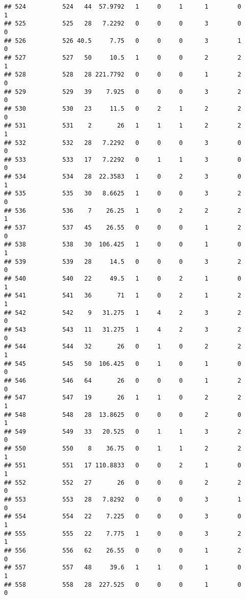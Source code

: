 \documentclass[
]{article}
\begin{document}
\begin{verbatim}
## 524          524   44  57.9792   1     0     1      1        0         1
## 525          525   28   7.2292   0     0     0      3        0         0
## 526          526 40.5     7.75   0     0     0      3        1         0
## 527          527   50     10.5   1     0     0      2        2         1
## 528          528   28 221.7792   0     0     0      1        2         0
## 529          529   39    7.925   0     0     0      3        2         0
## 530          530   23     11.5   0     2     1      2        2         0
## 531          531    2       26   1     1     1      2        2         1
## 532          532   28   7.2292   0     0     0      3        0         0
## 533          533   17   7.2292   0     1     1      3        0         0
## 534          534   28  22.3583   1     0     2      3        0         1
## 535          535   30   8.6625   1     0     0      3        2         0
## 536          536    7    26.25   1     0     2      2        2         1
## 537          537   45    26.55   0     0     0      1        2         0
## 538          538   30  106.425   1     0     0      1        0         1
## 539          539   28     14.5   0     0     0      3        2         0
## 540          540   22     49.5   1     0     2      1        0         1
## 541          541   36       71   1     0     2      1        2         1
## 542          542    9   31.275   1     4     2      3        2         0
## 543          543   11   31.275   1     4     2      3        2         0
## 544          544   32       26   0     1     0      2        2         1
## 545          545   50  106.425   0     1     0      1        0         0
## 546          546   64       26   0     0     0      1        2         0
## 547          547   19       26   1     1     0      2        2         1
## 548          548   28  13.8625   0     0     0      2        0         1
## 549          549   33   20.525   0     1     1      3        2         0
## 550          550    8    36.75   0     1     1      2        2         1
## 551          551   17 110.8833   0     0     2      1        0         1
## 552          552   27       26   0     0     0      2        2         0
## 553          553   28   7.8292   0     0     0      3        1         0
## 554          554   22    7.225   0     0     0      3        0         1
## 555          555   22    7.775   1     0     0      3        2         1
## 556          556   62    26.55   0     0     0      1        2         0
## 557          557   48     39.6   1     1     0      1        0         1
## 558          558   28  227.525   0     0     0      1        0         0

\end{verbatim}
\end{document}

